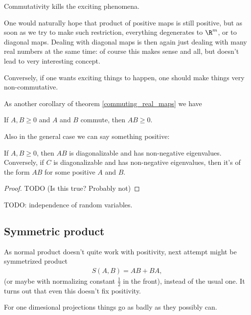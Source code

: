 \begin{phil}
	Commutativity kills the exciting phenomena.
\end{phil}

One would naturally hope that product of positive maps is still positive, but as soon as we try to make such restriction, everything degenerates to $\R^{m}$, or to diagonal maps. Dealing with diagonal maps is then again just dealing with many real numbers at the same time: of course this makes sense and all, but doesn't lead to very interesting concept.

Conversely, if one wants exciting things to happen, one should make things very non-commutative.

As another corollary of theorem \ref{commuting_real_maps} we have

\begin{kor}
	If $A, B \geq 0$ and $A$ and $B$ commute, then $AB \geq 0$.
\end{kor}

Also in the general case we can say something positive:

\begin{prop}
	If $A, B \geq 0$, then $AB$ is diagonalizable and has non-negative eigenvalues. Conversely, if $C$ is diagonalizable and has non-negative eigenvalues, then it's of the form $AB$ for some positive $A$ and $B$.
\end{prop}
\begin{proof}
	TODO (Is this true? Probably not)
\end{proof}

TODO: independence of random variables.

\subsection{Symmetric product}

As normal product doesn't quite work with positivity, next attempt might be symmetrized product
\begin{align*}
	S(A, B) = AB + BA,
\end{align*}
(or maybe with normalizing constant $\frac{1}{2}$ in the front), instead of the usual one. It turns out that even this doesn't fix positivity.

For one dimesional projections things go as badly as they possibly can.

